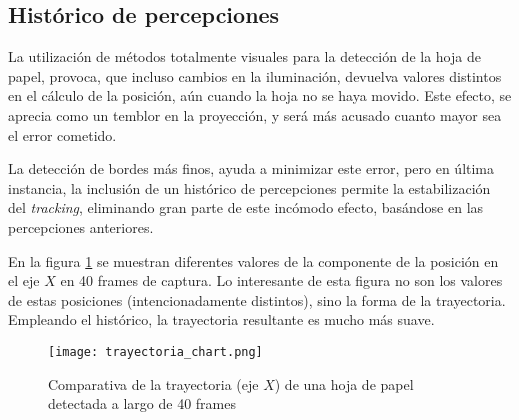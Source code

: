 


\subsection{Histórico de percepciones}
La utilización de métodos totalmente visuales para la detección de la hoja de papel, provoca, que incluso cambios en la iluminación, devuelva valores distintos en el cálculo de la posición, aún cuando la hoja no se haya movido. Este efecto, se aprecia como un temblor en la proyección, y será más acusado cuanto mayor sea el error cometido.

La detección de bordes más finos, ayuda a minimizar este error, pero en última instancia, la inclusión de un histórico de percepciones permite la estabilización del \textit{tracking}, eliminando gran parte de este incómodo efecto, basándose en las percepciones anteriores.

En la figura \ref{fig:historic_chart} se muestran diferentes valores de la componente de la posición en el eje $X$ en 40 frames de captura. Lo interesante de esta figura no son los valores de estas posiciones (intencionadamente distintos), sino la forma de la trayectoria. Empleando el histórico, la trayectoria resultante es mucho más suave.

\begin{figure}
  \begin{center}
    \texttt{[image: trayectoria\_chart.png]}
    \caption{Comparativa de la trayectoria (eje $X$) de una hoja de papel detectada a largo de 40 frames}
    \label{fig:historic_chart}
  \end{center}
\end{figure}


